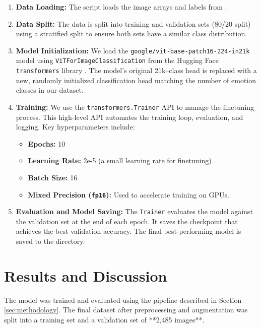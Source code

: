 \documentclass[12pt,a4paper]{report}
\begin{document}
\begin{enumerate}
    \item \textbf{Data Loading:} The script loads the image arrays and labels from .
    \item \textbf{Data Split:} The data is split into training and validation sets (80/20 split) using a stratified split to ensure both sets have a similar class distribution.
    \item \textbf{Model Initialization:} We load the \texttt{google/vit-base-patch16-224-in21k} model using \texttt{ViTForImageClassification} from the Hugging Face \texttt{transformers} library \cite{huggingface_vit}. The model's original 21k--class head is replaced with a new, randomly initialized classification head matching the number of emotion classes in our dataset.
    \item \textbf{Training:} We use the \texttt{transformers.Trainer} API to manage the finetuning process. This high-level API automates the training loop, evaluation, and logging. Key hyperparameters include:
        \begin{itemize}
            \item \textbf{Epochs:} 10
            \item \textbf{Learning Rate:} 2e-5 (a small learning rate for finetuning)
            \item \textbf{Batch Size:} 16
            \item \textbf{Mixed Precision (\texttt{fp16}):} Used to accelerate training on GPUs.
        \end{itemize}
    \item \textbf{Evaluation and Model Saving:} The \texttt{Trainer} evaluates the model against the validation set at the end of each epoch. It saves the checkpoint that achieves the best validation accuracy. The final best-performing model is saved to the  directory.
\end{enumerate}

\chapter{Results and Discussion}
\label{sec:results}
The model was trained and evaluated using the pipeline described in Section \ref{sec:methodology}. The final dataset after preprocessing and augmentation was split into a training set and a validation set of **2,485 images**.
\end{document}
